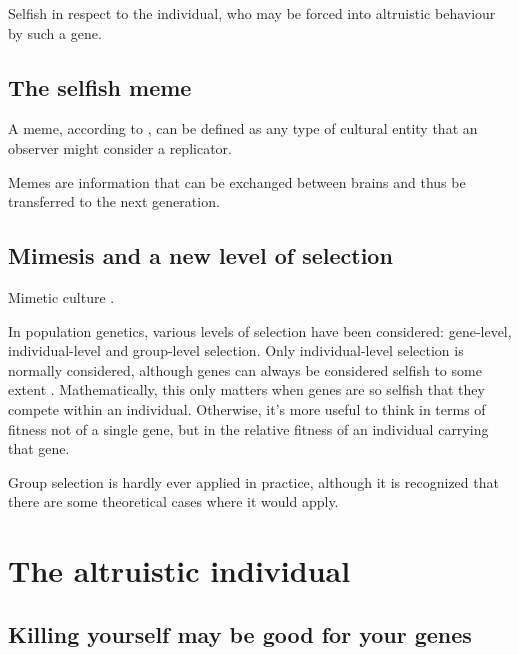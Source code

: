 \documentclass{article}
\begin{document}
Selfish in respect to the individual, who may be forced into altruistic behaviour by such a gene.

\subsection{The selfish meme}
\label{sec:memes}

A meme, according to \citet{dawkins1976}, can be defined as any type of cultural entity that an observer might consider a replicator.

Memes are information that can be exchanged between brains and thus be transferred to the next generation.

\subsection{Mimesis and a new level of selection}

Mimetic culture \citet{donald1991}.




In population genetics, various levels of selection have been considered: gene-level, individual-level and group-level selection. Only individual-level selection is normally considered, although genes can always be considered selfish to some extent \citep{dawkins1976}. Mathematically, this only matters when genes are so selfish that they compete within an individual. Otherwise, it's more useful to think in terms of fitness not of a single gene, but in the relative fitness of an individual carrying that gene.

Group selection is hardly ever applied in practice, although it is recognized that there are some theoretical cases where it would apply.


\section{The altruistic individual}

\subsection{Killing yourself may be good for your genes}
\end{document}
